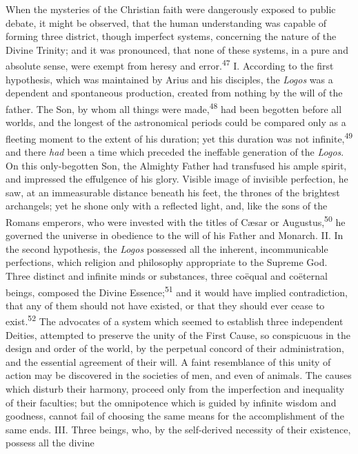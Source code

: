 When the mysteries of the Christian faith were dangerously
exposed to public debate, it might be observed, that the human
understanding was capable of forming three district, though
imperfect systems, concerning the nature of the Divine Trinity;
and it was pronounced, that none of these systems, in a pure and
absolute sense, were exempt from heresy and error.\textsuperscript{47} I.
According to the first hypothesis, which was maintained by Arius
and his disciples, the \textit{Logos} was a dependent and spontaneous
production, created from nothing by the will of the father. The
Son, by whom all things were made,\textsuperscript{48} had been begotten before
all worlds, and the longest of the astronomical periods could be
compared only as a fleeting moment to the extent of his duration;
yet this duration was not infinite,\textsuperscript{49} and there \textit{had} been a
time which preceded the ineffable generation of the \textit{Logos}. On
this only-begotten Son, the Almighty Father had transfused his
ample spirit, and impressed the effulgence of his glory. Visible
image of invisible perfection, he saw, at an immeasurable
distance beneath his feet, the thrones of the brightest
archangels; yet he shone only with a reflected light, and, like
the sons of the Romans emperors, who were invested with the
titles of Cæsar or Augustus,\textsuperscript{50} he governed the universe in
obedience to the will of his Father and Monarch. II. In the
second hypothesis, the \textit{Logos} possessed all the inherent,
incommunicable perfections, which religion and philosophy
appropriate to the Supreme God. Three distinct and infinite minds
or substances, three coëqual and coëternal beings, composed the
Divine Essence;\textsuperscript{51} and it would have implied contradiction, that
any of them should not have existed, or that they should ever
cease to exist.\textsuperscript{52} The advocates of a system which seemed to
establish three independent Deities, attempted to preserve the
unity of the First Cause, so conspicuous in the design and order
of the world, by the perpetual concord of their administration,
and the essential agreement of their will. A faint resemblance of
this unity of action may be discovered in the societies of men,
and even of animals. The causes which disturb their harmony,
proceed only from the imperfection and inequality of their
faculties; but the omnipotence which is guided by infinite wisdom
and goodness, cannot fail of choosing the same means for the
accomplishment of the same ends. III. Three beings, who, by the
self-derived necessity of their existence, possess all the divine
